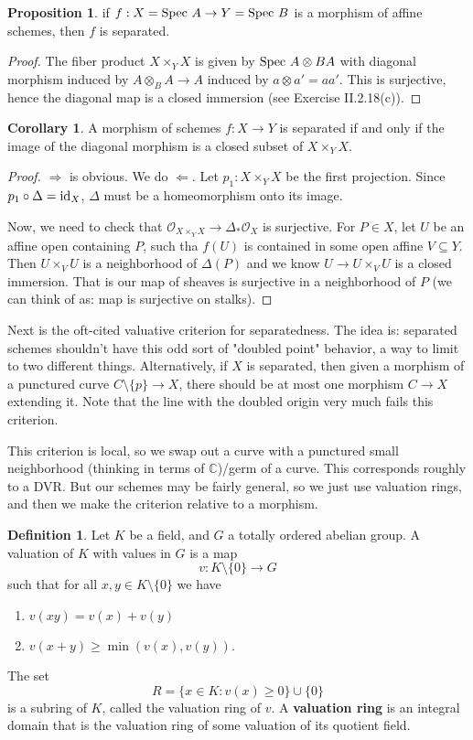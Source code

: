 \documentclass[10pt,reqno]{amsart}
\theoremstyle{definition}
\newtheorem{corollary}[theorem]{Corollary}
\newtheorem{definition}[theorem]{Definition}
\newtheorem{proposition}[theorem]{Proposition}
\theoremstyle{remark}
\numberwithin{equation}{section}
\numberwithin{theorem}{section}
\newcommand{\C}{{\mathbb C}}
\newcommand{\OO}{{\mathcal O}}
\newcommand{\spec}{\textup{Spec }}
\begin{document}
\begin{proposition} if $f: X = \spec A \to Y = \spec B$ is a morphism of affine schemes, then $f$ is separated.
\end{proposition}
\begin{proof}
The fiber product $X \times_Y X$ is given by $\spec A \otimes B A$ with diagonal morphism induced by $A \otimes_B A \to A$ induced by $a \otimes a' = aa'$. This is surjective, hence the diagonal map is a closed immersion (see Exercise II.2.18(c)).
\end{proof}

\begin{corollary} A morphism of schemes $f: X \to Y$ is separated if and only if the image of the diagonal morphism is a closed subset of $X \times_Y X$.
\end{corollary}
\begin{proof}
$\Rightarrow$ is obvious. We do $\Leftarrow$. Let $p_1: X \times_Y X$ be the first projection. Since $p_1 \circ \Delta = \textup{id}_X$, $\Delta$ must be a homeomorphism onto its image.

Now, we need to check that $\OO_{X \times_Y X} \to \Delta_* \OO_X$ is surjective. For $P \in X$, let $U$ be an affine open containing $P$, such tha $f(U)$ is contained in some open affine $V \subseteq Y$. Then $U \times_V U$ is a neighborhood of $\Delta(P)$ and we know $U \to U \times_V U$ is a closed immersion. That is our map of sheaves is surjective in a neighborhood of $P$ (we can think of as: map is surjective on stalks).
\end{proof}

Next is the oft-cited valuative criterion for separatedness. The idea is: separated schemes shouldn't have this odd sort of "doubled point" behavior, a way to limit to two different things. Alternatively, if $X$ is separated, then given a morphism of a punctured curve $C \setminus \{p\} \to X$, there should be at most one morphism $C \to X$ extending it. Note that the line with the doubled origin very much fails this criterion.

This criterion is local, so we swap out a curve with a punctured small neighborhood (thinking in terms of $\C$)/germ of a curve. This corresponds roughly to a DVR. But our schemes may be fairly general, so we just use valuation rings, and then we make the criterion relative to a morphism.

\begin{definition} Let $K$ be a field, and $G$ a totally ordered abelian group. A valuation of $K$ with values in $G$ is a map
\[v: K \setminus \{0\} \to G\]
such that for all $x,y \in K \setminus \{0\}$ we have
\begin{enumerate}[(1)]
\item $v(xy) = v(x) + v(y)$
\item $v(x+y) \ge \min(v(x),v(y))$.
\end{enumerate}
The set 
\[R = \{x \in K : v(x) \ge 0\} \cup \{0\}\]
is a subring of $K$, called the valuation ring of $v$. A \textbf{valuation ring} is an integral domain that is the valuation ring of some valuation of its quotient field.
\end{definition}
\end{document}
